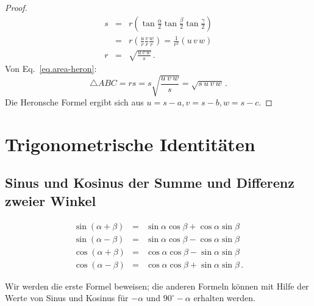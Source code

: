 \begin{proof}
\begin{eqnarray*}
s&=&r\left(\tan \frac{\alpha}{2}\tan \frac{\beta}{2}\tan \frac{\gamma}{2}\right)\\
&=&r\left(\frac{u}{r}\frac{v}{r}\frac{w}{r}\right)=\frac{1}{r^2}(u\,v\,w)\\
r&=&\sqrt{\displaystyle\frac{u\,v\,w}{s}}\,.
\end{eqnarray*}
Von Eq.~\ref{eq.area-heron}:
\[
\triangle ABC=rs=s\sqrt{\displaystyle\frac{u\,v\,w}{s}}=\sqrt{s\,u\,v\,w}\,.
\]
Die Heronsche Formel ergibt sich aus $u=s-a, v=s-b, w=s-c$.
\end{proof}



\section{Trigonometrische Identitäten}\label{a.trig-identities}




\subsection{Sinus und Kosinus der Summe und Differenz zweier Winkel} \label{s.sum-of-trig}

\begin{theorem}\label{thm.sum-of-trig}
\begin{eqnarray*}
\sin(\alpha+\beta) &=& \sin\alpha\cos\beta + \cos\alpha\sin\beta\\
\sin(\alpha-\beta) &=& \sin\alpha\cos\beta - \cos\alpha\sin\beta\\
\cos(\alpha+\beta) &=& \cos\alpha\cos\beta - \sin\alpha\sin\beta\\
\cos(\alpha-\beta) &=& \cos\alpha\cos\beta + \sin\alpha\sin\beta\,.
\end{eqnarray*}
\end{theorem}
Wir werden die erste Formel beweisen; die anderen Formeln können mit Hilfe der Werte von Sinus und Kosinus für $-\alpha$ und $90^\circ-\alpha$ erhalten werden.

